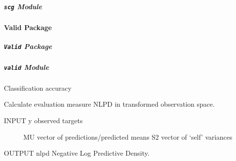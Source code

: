 \documentclass[letterpaper,10pt,english]{sphinxmanual}
\begin{document}
\begin{fulllineitems}
\label{pyGPs.Optimization:pyGPs.Optimization.minimize.run}
\end{fulllineitems}



\subparagraph{\texttt{scg} Module}
\label{pyGPs.Optimization:scg-module}\label{pyGPs.Optimization:module-pyGPs.Optimization.scg}

\begin{fulllineitems}
\label{pyGPs.Optimization:pyGPs.Optimization.scg.run}
\end{fulllineitems}



\paragraph{Valid Package}
\label{pyGPs.Valid:valid-package}\label{pyGPs.Valid::doc}

\subparagraph{\texttt{Valid} Package}
\label{pyGPs.Valid:id1}\label{pyGPs.Valid:module-pyGPs.Valid}

\subparagraph{\texttt{valid} Module}
\label{pyGPs.Valid:module-pyGPs.Valid.valid}\label{pyGPs.Valid:valid-module}

\begin{fulllineitems}
\label{pyGPs.Valid:pyGPs.Valid.valid.ACC}
Classification accuracy

\end{fulllineitems}


\begin{fulllineitems}
\label{pyGPs.Valid:pyGPs.Valid.valid.NLPD}
Calculate evaluation measure NLPD in transformed observation space.
\begin{description}
\item[{INPUT   y     observed targets}] \leavevmode
MU    vector of predictions/predicted means
S2    vector of `self' variances

\end{description}

OUTPUT  nlpd  Negative Log Predictive Density.

\end{fulllineitems}
\end{document}

